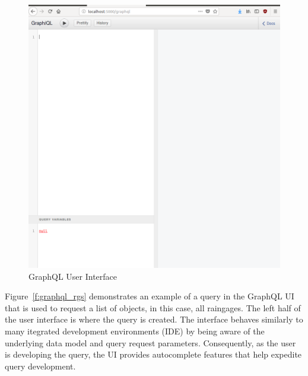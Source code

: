 \begin{figure}[htb]
  \centering\includegraphics[width=\columnwidth]
  {./images/graphql_ui.png}
  \caption{GraphQL User Interface}\label{f:graphql_ui}
\end{figure}

Figure~\ref{f:graphql_rgs} demonstrates an example of a query in the GraphQL UI 
that is used to request a list of objects, in this case, all raingages.  The 
left half of the user interface is where the query is created.  The interface 
behaves similarly to many itegrated development environments (IDE) by being 
aware of the underlying data model and query request parameters.  Consequently, 
as the user is developing the query, the UI provides autocomplete features that 
help expedite query development.

